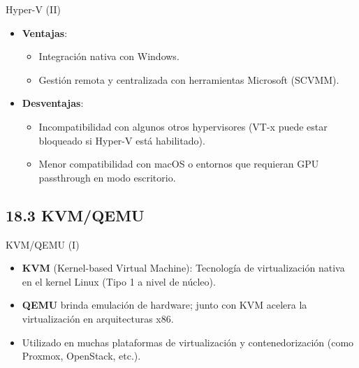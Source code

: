 \documentclass{beamer}
\begin{document}
\begin{frame}{Hyper-V (II)}
    \begin{itemize}
        \item \textbf{Ventajas}:
            \begin{itemize}
                \item Integración nativa con Windows.
                \item Gestión remota y centralizada con herramientas Microsoft (SCVMM).
            \end{itemize}
        \item \textbf{Desventajas}:
            \begin{itemize}
                \item Incompatibilidad con algunos otros hypervisores (VT-x puede estar bloqueado si Hyper-V está habilitado).
                \item Menor compatibilidad con macOS o entornos que requieran GPU passthrough en modo escritorio.
            \end{itemize}
    \end{itemize}
\end{frame}

\subsection{18.3 KVM/QEMU}
\begin{frame}{KVM/QEMU (I)}
    \begin{itemize}
        \item \textbf{KVM} (Kernel-based Virtual Machine): Tecnología de virtualización nativa en el kernel Linux (Tipo 1 a nivel de núcleo).
        \item \textbf{QEMU} brinda emulación de hardware; junto con KVM acelera la virtualización en arquitecturas x86.
        \item Utilizado en muchas plataformas de virtualización y contenedorización (como Proxmox, OpenStack, etc.).
    \end{itemize}
\end{frame}
\end{document}
